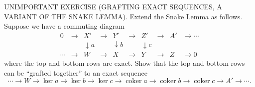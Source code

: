 UNIMPORTANT EXERCISE (GRAFTING EXACT SEQUENCES, A VARIANT OF THE SNAKE LEMMA). Extend the Snake Lemma as follows. Suppose we have a commuting diagram
$$
\begin{array}{ccccccccc}
0 & \to & X' & \to & Y' & \to & Z' & \to & A' & \to \cdots \\
  &     & \downarrow a & & \downarrow b & & \downarrow c \\
\cdots & \to & W & \to & X & \to & Y & \to & Z & \to 0
\end{array}
$$
where the top and bottom rows are exact. Show that the top and bottom rows can be “grafted together” to an exact sequence
$$
\cdots \to W \to \ker a \to \ker b \to \ker c \to \operatorname{coker} a \to \operatorname{coker} b \to \operatorname{coker} c \to A' \to \cdots.
$$
